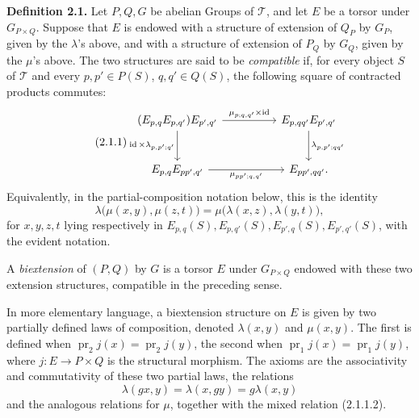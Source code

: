 \documentclass[11pt]{article}
\providecommand{\pr}{\operatorname{pr}}
\providecommand{\id}{\operatorname{id}}
\begin{document}
\textbf{Definition 2.1.}  Let \(P,Q,G\) be abelian Groups of \(\mathcal T\), and let \(E\) be a torsor under \(G_{P\times Q}\).  Suppose that \(E\) is endowed with a structure of extension of \(Q_P\) by \(G_P\), given by the \(\lambda\)'s above, and with a structure of extension of \(P_Q\) by \(G_Q\), given by the \(\mu\)'s above.  The two structures are said to be \emph{compatible} if, for every object \(S\) of \(\mathcal T\) and every \(p,p'\in P(S)\), \(q,q'\in Q(S)\), the following square of contracted products commutes:
\begin{equation}\tag{2.1.1}
\begin{tikzcd}[column sep=huge,row sep=large]
(E_{p,q}E_{p,q'})E_{p',q'}
\arrow[r,"\mu_{p;q,q'}\times\id"]
\arrow[d,"\id\times\lambda_{p,p';q'}"']
& E_{p,qq'}E_{p',q'}\arrow[d,"\lambda_{p,p';qq'}"]\\
E_{p,q}E_{pp',q'}\arrow[r,"\mu_{pp';q,q'}"']&E_{pp',qq'} .
\end{tikzcd}
\end{equation}
Equivalently, in the partial-composition notation below, this is the identity
\begin{equation}\tag{2.1.1.2}
  \lambda\bigl(\mu(x,y),\mu(z,t)\bigr)
  =
  \mu\bigl(\lambda(x,z),\lambda(y,t)\bigr),
\end{equation}
for \(x,y,z,t\) lying respectively in \(E_{p,q}(S),E_{p,q'}(S),E_{p',q}(S),E_{p',q'}(S)\), with the evident notation.

A \emph{biextension} of \((P,Q)\) by \(G\) is a torsor \(E\) under \(G_{P\times Q}\) endowed with these two extension structures, compatible in the preceding sense.

In more elementary language, a biextension structure on \(E\) is given by two partially defined laws of composition, denoted \(\lambda(x,y)\) and \(\mu(x,y)\).  The first is defined when \(\pr_2 j(x)=\pr_2 j(y)\), the second when \(\pr_1 j(x)=\pr_1 j(y)\), where \(j:E\to P\times Q\) is the structural morphism.  The axioms are the associativity and commutativity of these two partial laws, the relations
\begin{equation}\tag{2.1.1.1}
  \lambda(gx,y)=\lambda(x,gy)=g\lambda(x,y)
\end{equation}
and the analogous relations for \(\mu\), together with the mixed relation (2.1.1.2).
\end{document}
